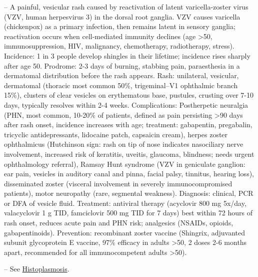 -- A painful, vesicular rash caused by reactivation of latent varicella-zoster virus (VZV, human herpesvirus 3) in the dorsal root ganglia. VZV causes varicella (chickenpox) as a primary infection, then remains latent in sensory ganglia; reactivation occurs when cell-mediated immunity declines (age >50, immunosuppression, HIV, malignancy, chemotherapy, radiotherapy, stress). Incidence: 1 in 3 people develop shingles in their lifetime; incidence rises sharply after age 50. Prodrome: 2-3 days of burning, stabbing pain, paraesthesia in a dermatomal distribution before the rash appears. Rash: unilateral, vesicular, dermatomal (thoracic most common 50\%, trigeminal--V1 ophthalmic branch 15\%), clusters of clear vesicles on erythematous base, pustules, crusting over 7-10 days, typically resolves within 2-4 weeks. Complications: Postherpetic neuralgia (PHN, most common, 10-20\% of patients, defined as pain persisting >90 days after rash onset, incidence increases with age; treatment: gabapentin, pregabalin, tricyclic antidepressants, lidocaine patch, capsaicin cream), herpes zoster ophthalmicus (Hutchinson sign: rash on tip of nose indicates nasociliary nerve involvement, increased risk of keratitis, uveitis, glaucoma, blindness; needs urgent ophthalmology referral), Ramsay Hunt syndrome (VZV in geniculate ganglion: ear pain, vesicles in auditory canal and pinna, facial palsy, tinnitus, hearing loss), disseminated zoster (visceral involvement in severely immunocompromised patients), motor neuropathy (rare, segmental weakness). Diagnosis: clinical, PCR or DFA of vesicle fluid. Treatment: antiviral therapy (acyclovir 800 mg 5x/day, valacyclovir 1 g TID, famciclovir 500 mg TID for 7 days) best within 72 hours of rash onset, reduces acute pain and PHN risk; analgesics (NSAIDs, opioids, gabapentinoids). Prevention: recombinant zoster vaccine (Shingrix, adjuvanted subunit glycoprotein E vaccine, 97\% efficacy in adults >50, 2 doses 2-6 months apart, recommended for all immunocompetent adults >50).

-- See \hyperlink{Histoplasmosis}{Histoplasmosis}.

